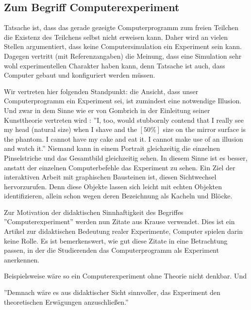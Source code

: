 \documentclass[twocolumn, 10pt]{article}
\begin{document}
\subsection{Zum Begriff Computerexperiment}
Tatsache ist, dass das gerade gezeigte Computerprogramm zum freien Teilchen die Existenz des Teilchens selbst nicht erweisen kann. Daher wird an vielen Stellen argumentiert, dass keine Computersimulation ein Experiment sein kann. Dagegen vertritt \cite{cParker 22} (mit Referenzangaben) die Meinung, dass eine Simulation sehr wohl experimentellen Charakter haben kann, denn Tatsache ist auch, dass Computer gebaut und konfiguriert werden müssen.

Wir vertreten hier folgenden Standpunkt: die Ansicht, dass unser Computerprogramm ein Experiment sei, ist zumindest eine notwendige Illusion. Und zwar in dem Sinne wie er von Gombrich in der Einleitung seiner Kunsttheorie vertreten wird \cite{cGombrich 23}: ''I, too, would stubbornly contend that I really see my head (natural size) when I shave and the $[ 50 \%]$  size on the mirror surface is the phantom. I cannot have my cake and eat it. I cannot make use of an illusion and watch it.'' 
Niemand kann in einem Portrait gleichzeitig die einzelnen Pinselstriche und das Gesamtbild gleichzeitig sehen. In diesem Sinne ist es besser, anstatt der einzelnen Computerbefehle das Experiment zu sehen. Ein Ziel der interaktiven Arbeit mit graphischen Bausteinen ist, diesen Sichtwechsel hervorzurufen. Denn diese Objekte lassen sich leicht mit echten Objekten identifizieren, allein schon wegen deren Bezeichnung als Kacheln und Blöcke.

Zur Motivation der didaktischen Sinnhaftigkeit des Begriffes ''Computerexperiment'' werden nun Zitate aus Krause \cite{cKrause 15} verwendet. Dies ist ein Artikel zur didaktischen Bedeutung realer Experimente, Computer spielen darin keine Rolle. Es ist bemerkenswert, wie gut diese Zitate in eine Betrachtung passen, in der die Studierenden das Computerprogramm als Experiment anerkennen.

Beispielsweise wäre so ein Computerexperiment ohne Theorie nicht denkbar. Und

''Demnach wäre es aus didaktischer Sicht sinnvoller, das Experiment den theoretischen Erwägungen anzuschließen.''
\end{document}
